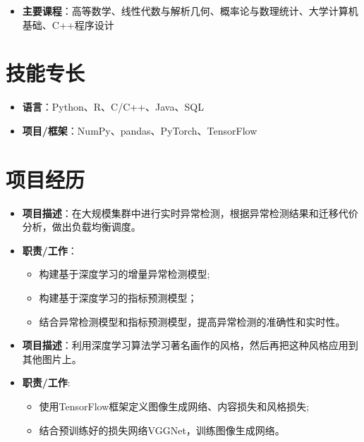 \documentclass{resume}
\begin{document}
\begin{itemize}[parsep=1ex]
  \item \textbf{主要课程}：高等数学、线性代数与解析几何、概率论与数理统计、大学计算机基础、C++程序设计
\end{itemize}

\section{技能专长}

\begin{itemize}[parsep=1ex]
  \item \textbf{语言}：Python、R、C/C++、Java、SQL
  \item \textbf{项目/框架}：NumPy、pandas、PyTorch、TensorFlow
\end{itemize}

\section{项目经历}

\begin{itemize}[parsep=1ex]
  \item \textbf{项目描述}：在大规模集群中进行实时异常检测，根据异常检测结果和迁移代价分析，做出负载均衡调度。
  \item \textbf{职责/工作}：
    \begin{itemize}[parsep=0.5ex]
      \item 构建基于深度学习的增量异常检测模型;
      \item 构建基于深度学习的指标预测模型；
      \item 结合异常检测模型和指标预测模型，提高异常检测的准确性和实时性。
    \end{itemize}
\end{itemize}

\begin{itemize}[parsep=1ex]
  \item \textbf{项目描述}：利用深度学习算法学习著名画作的风格，然后再把这种风格应用到其他图片上。
  \item \textbf{职责/工作}:
    \begin{itemize}[parsep=0.5ex]
      \item 使用TensorFlow框架定义图像生成网络、内容损失和风格损失;
      \item 结合预训练好的损失网络VGGNet，训练图像生成网络。
    \end{itemize}
\end{itemize}
\end{document}
